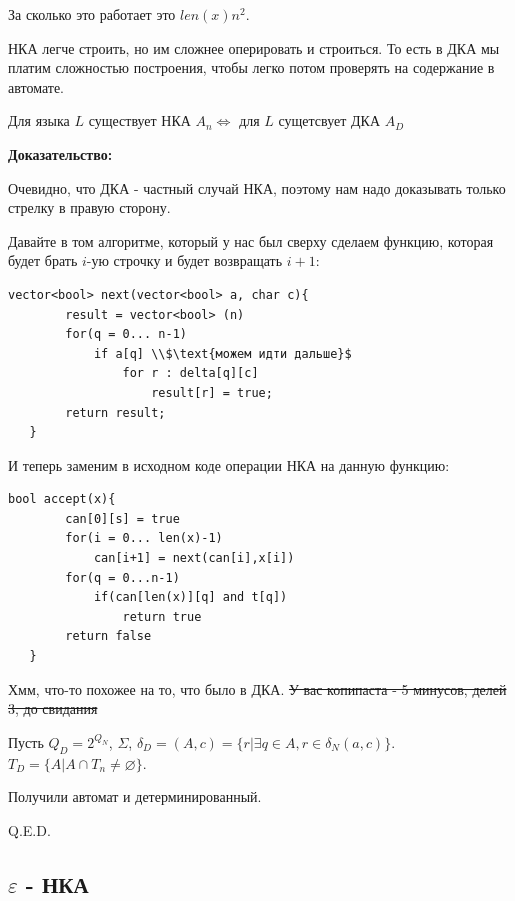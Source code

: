 За сколько это работает это $len(x) n^2$. 

НКА легче строить, но им сложнее оперировать и строиться. То есть в ДКА мы платим сложностью построения, чтобы легко потом проверять на содержание в автомате.


Для языка $L$ существует НКА $A_n \Leftrightarrow$ для $L$ сущетсвует ДКА $A_D$

\textbf{Доказательство:}

    Очевидно, что ДКА - частный случай НКА, поэтому нам надо доказывать только стрелку в правую сторону.


    Давайте в том алгоритме, который у нас был сверху сделаем функцию, которая будет брать $i$-ую строчку и будет возвращать $i+1$:
    
    \begin{lstlisting}[mathescape]
     vector<bool> next(vector<bool> a, char c){
        result = vector<bool> (n)
        for(q = 0... n-1)
            if a[q] \\$\text{можем идти дальше}$
                for r : delta[q][c]
                    result[r] = true;
        return result;
   }
    \end{lstlisting}

    И теперь заменим в исходном коде операции НКА на данную функцию:

    \begin{lstlisting}[mathescape]
   bool accept(x){
        can[0][s] = true
        for(i = 0... len(x)-1)
            can[i+1] = next(can[i],x[i])
        for(q = 0...n-1)
            if(can[len(x)][q] and t[q])
                return true
        return false
   }
\end{lstlisting}

    Хмм, что-то похожее на то, что было в ДКА. \sout{У вас копипаста - 5 минусов, делей 3, до свидания}

    Пусть $Q_D = 2^{Q_N}$, $\Sigma$,  $\delta_{D} =(A,c) = \{r | \exists q \in A, r \in \delta_N(a,c)\}$. $T_D = \{A | A \cap T_n \neq \varnothing\}$. 
    
    Получили автомат и детерминированный.
    
\hfill Q.E.D.

\subsection{$\varepsilon$ - НКА}


